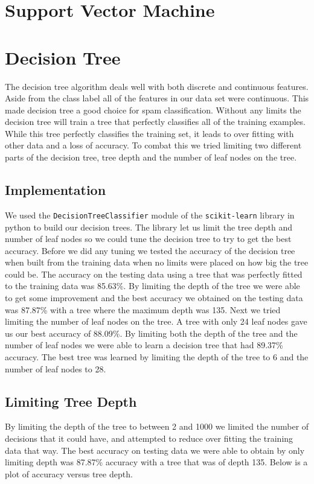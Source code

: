 \documentclass{article} %
\begin{document}
\section{Support Vector Machine}
\section{Decision Tree}
The decision tree algorithm deals well with both discrete and continuous features. Aside from the class label all of the features in our data set were continuous. This made decision tree a good choice for spam classification. Without any limits the decision tree will train a tree that perfectly classifies all of the training examples. While this tree perfectly classifies the training set, it leads to over fitting with other data and a loss of accuracy. To combat this we tried limiting two different parts of the decision tree, tree depth and the number of leaf nodes on the tree.

\subsection{Implementation}
We used the \texttt{DecisionTreeClassifier} module of the \texttt{scikit-learn} library in python to build our decision trees. The library let us limit the tree depth and number of leaf nodes so we could tune the decision tree to try to get the best accuracy. Before we did any tuning we tested the accuracy of the decision tree when built from the training data when no limits were placed on how big the tree could be. The accuracy on the testing data using a tree that was perfectly fitted to the training data was 85.63\%. By limiting the depth of the tree we were able to get some improvement and the best accuracy we obtained on the testing data was 87.87\% with a tree where the maximum depth was 135. Next we tried limiting the number of leaf nodes on the tree. A tree with only 24 leaf nodes gave us our best accuracy of 88.09\%. By limiting both the depth of the tree and the number of leaf nodes we were able to learn a decision tree that had 89.37\% accuracy. The best tree was learned by limiting the depth of the tree to 6 and the number of leaf nodes to 28.

\subsection{Limiting Tree Depth}
By limiting the depth of the tree to between 2 and 1000 we limited the number of decisions that it could have, and attempted to reduce over fitting the training data that way. The best accuracy on testing data we were able to obtain by only limiting depth was 87.87\% accuracy with a tree that was of depth 135. Below is a plot of accuracy versus tree depth.
\end{document}
